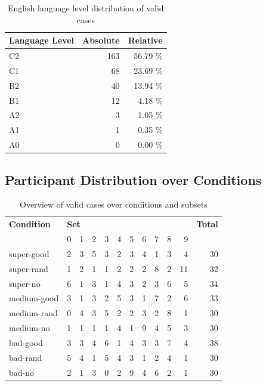 \begin{table}[H]
	\centering
	\begin{tabular}{l|rr}
		\textbf{Language Level} & \textbf{Absolute} & \textbf{Relative} \\ \midrule
		C2 			& 163 & 56.79 \%\\
		C1		 	& 68 & 23.69 \%\\
		B2	 		& 40 & 13.94 \%\\ 
		B1 			& 12 & 4.18 \%\\ 
		A2 			& 3 & 1.05 \%\\ 
		A1	 		& 1 & 0.35 \%\\ 
		A0 			& 0 & 0.00 \%\\ \bottomrule
	\end{tabular}
	\caption{English language level distribution of valid cases}
\end{table}




\subsection{Participant Distribution over Conditions}
\begin{table}[H]
	\centering
	\begin{tabular}{l|rrrrrrrrrr|r}
		\textbf{Condition} & \multicolumn{10}{l|}{\textbf{Set}} & \textbf{Total} \\
		  & 0 & 1 & 2 & 3 & 4 & 5 & 6 & 7 & 8 & 9 & \\ \midrule
		super-good & 	2 &  3 &  5 &  3 &  2 &  3 &  4 &  1 &  3 &  4 &  	 30 \\
		super-rand & 	1 &  2 &  1 &  1 &  2 &  2 &  2 &  8 &  2 &  11 &  	 32 \\
		super-no & 	6 &  1 &  3 &  1 &  4 &  3 &  2 &  3 &  6 &  5 &  	 34 \\
		medium-good & 	3 &  1 &  3 &  2 &  5 &  3 &  1 &  7 &  2 &  6 &  	 33 \\
		medium-rand & 	0 &  4 &  3 &  5 &  2 &  2 &  3 &  2 &  8 &  1 &  	 30 \\
		medium-no & 	1 &  1 &  1 &  1 &  4 &  1 &  9 &  4 &  5 &  3 &  	 30 \\
		bad-good & 	3 &  3 &  4 &  6 &  1 &  4 &  3 &  3 &  7 &  4 &  	 38 \\
		bad-rand & 	5 &  4 &  1 &  5 &  4 &  3 &  1 &  2 &  4 &  1 &  	 30 \\
		bad-no & 	2 &  1 &  3 &  0 &  2 &  9 &  4 &  6 &  2 &  1 &  	 30 \\ \bottomrule
	\end{tabular}
	\caption{Overview of valid cases over conditions and subsets}
\end{table}


